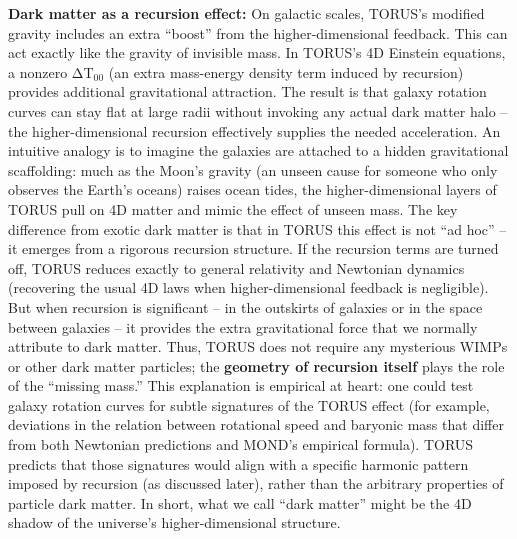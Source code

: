 \documentclass[]{article}
\newcommand{\subscript}[1]{\ensuremath{_{\mathrm{#1}}}}
\begin{document}
\textbf{Dark matter as a recursion effect:} On galactic scales, TORUS's
modified gravity includes an extra ``boost'' from the higher-dimensional
feedback. This can act exactly like the gravity of invisible mass. In
TORUS's 4D Einstein equations, a nonzero
ΔT\subscript{00} (an extra
mass-energy density term induced by recursion) provides additional
gravitational attraction​. The result is that galaxy rotation curves can
stay flat at large radii without invoking any actual dark matter halo --
the higher-dimensional recursion effectively supplies the needed
acceleration​. An intuitive analogy is to imagine the galaxies are
attached to a hidden gravitational scaffolding: much as the Moon's
gravity (an unseen cause for someone who only observes the Earth's
oceans) raises ocean tides, the higher-dimensional layers of TORUS pull
on 4D matter and mimic the effect of unseen mass. The key difference
from exotic dark matter is that in TORUS this effect is not ``ad hoc''
-- it emerges from a rigorous recursion structure. If the recursion
terms are turned off, TORUS reduces exactly to general relativity and
Newtonian dynamics (recovering the usual 4D laws when higher-dimensional
feedback is negligible)​. But when recursion is significant -- in the
outskirts of galaxies or in the space between galaxies -- it provides
the extra gravitational force that we normally attribute to dark matter.
Thus, TORUS does not require any mysterious WIMPs or other dark matter
particles; the \textbf{geometry of recursion itself} plays the role of
the ``missing mass.'' This explanation is empirical at heart: one could
test galaxy rotation curves for subtle signatures of the TORUS effect
(for example, deviations in the relation between rotational speed and
baryonic mass that differ from both Newtonian predictions and MOND's
empirical formula)​. TORUS predicts that those signatures would align
with a specific harmonic pattern imposed by recursion (as discussed
later), rather than the arbitrary properties of particle dark matter. In
short, what we call ``dark matter'' might be the 4D shadow of the
universe's higher-dimensional structure.
\end{document}
